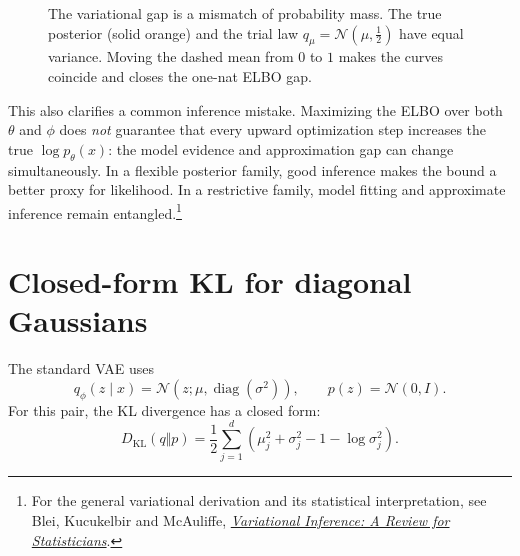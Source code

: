 \begin{figure}[H]
\centering
{}
\caption{The variational gap is a mismatch of probability mass. The true posterior (solid orange) and the trial law $q_\mu=\mathcal N(\mu,\tfrac12)$ have equal variance. Moving the dashed mean from $0$ to $1$ makes the curves coincide and closes the one-nat ELBO gap.}
\end{figure}

This also clarifies a common inference mistake. Maximizing the ELBO over both $\theta$ and $\phi$ does \emph{not} guarantee that every upward optimization step increases the true $\log p_\theta(x)$: the model evidence and approximation gap can change simultaneously. In a flexible posterior family, good inference makes the bound a better proxy for likelihood. In a restrictive family, model fitting and approximate inference remain entangled.\footnote{For the general variational derivation and its statistical interpretation, see Blei, Kucukelbir and McAuliffe, \href{https://arxiv.org/abs/1601.00670}{\emph{Variational Inference: A Review for Statisticians}}.}

\section{Closed-form KL for diagonal Gaussians}

The standard VAE uses
\[
  q_\phi(z\mid x)=\mathcal N(z;\mu,\operatorname{diag}(\sigma^2)),
  \qquad
  p(z)=\mathcal N(0,I).
\]
For this pair, the KL divergence has a closed form:
\[
  D_{\mathrm{KL}}(q\Vert p)
  =\frac12\sum_{j=1}^d
  \left(\mu_j^2+\sigma_j^2-1-\log\sigma_j^2\right).
\]

